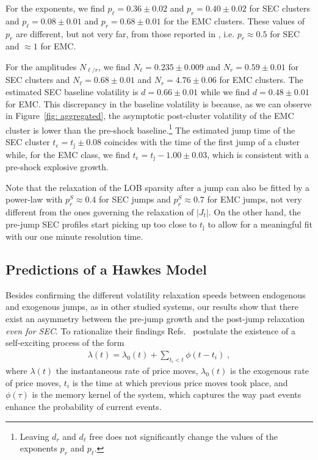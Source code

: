 \documentclass[amsmath,amssymb,aps,pre,floatfix,twocolumn,superscriptaddress]{revtex4}
\begin{document}
For the exponents, we find $p_\ell=0.36 \pm 0.02$ and $p_r=0.40 \pm 0.02$ for SEC clusters and $p_\ell=0.08 \pm 0.01$ and $p_r=0.68 \pm 0.01$ for the EMC clusters. These values of $p_r$ are different, but not very far, from those reported in \cite{vol_news_jp}, i.e. $p_r \approx 0.5$ for SEC and $\approx 1$ for EMC.  

For the amplitudes $N_{\ell/r}$, we find $N_\ell = 0.235 \pm 0.009$ and  $N_r = 0.59 \pm 0.01$ for SEC clusters and $N_\ell = 0.68 \pm 0.01$ and  $N_r = 4.76 \pm 0.06$ for EMC clusters. The estimated SEC baseline volatility is $d = 0.66 \pm 0.01$ while we find $d = 0.48 \pm 0.01$ for EMC. This discrepancy in the baseline volatility is because, as we can observe in Figure~\ref{fig: aggregated}, the asymptotic post-cluster volatility of the EMC cluster is lower than the pre-shock baseline.\footnote{Leaving $d_r$ and $d_\ell$ free does not significantly change the values of the exponents $p_r$ and $p_\ell$.} The estimated jump time of the SEC cluster $t_{\text{c}} = t_{\text{j}} \pm 0.08$ coincides with the time of the first jump of a cluster while, for the EMC class, we find $t_{\text{c}} = t_{\text{j}}-1.00 \pm 0.03$, which is consistent with a pre-shock explosive growth.

Note that the relaxation of the LOB sparsity after a jump can also be fitted by a power-law with $p_r^{S} \approx 0.4$ for SEC jumps and $p_r^{S} \approx 0.7$ for EMC jumps, not very different from the ones governing the relaxation of $|J_t|$. On the other hand, the pre-jump SEC profiles start picking up too close to $t_{\text{j}}$ to allow for a meaningful fit with our one minute resolution time.

\subsection{Predictions of a Hawkes Model}

Besides confirming the different volatility relaxation speeds between endogenous and exogenous jumps, as in other studied systems, our results show that there exist an asymmetry between the pre-jump growth and the post-jump relaxation {\it even for SEC}. To rationalize their findings Refs.~\cite{sornette_youtube,sornette_books}  postulate the existence of a  self-exciting process of the form
\begin{equation}\label{eq: hawkes simple}
\begin{aligned}
\lambda(t) =  \lambda_0(t) + \sum_{t_i < t} \phi(t-t_i)  \; ,
\end{aligned}
\end{equation}
where $\lambda(t)$ the instantaneous rate of price moves, $\lambda_0(t)$ is the exogenous rate of price moves, $t_i$ is the time at which previous price moves took place, and $\phi(\tau)$ is the memory kernel of the system, which captures the way past events enhance the probability of current events. 
\end{document}
